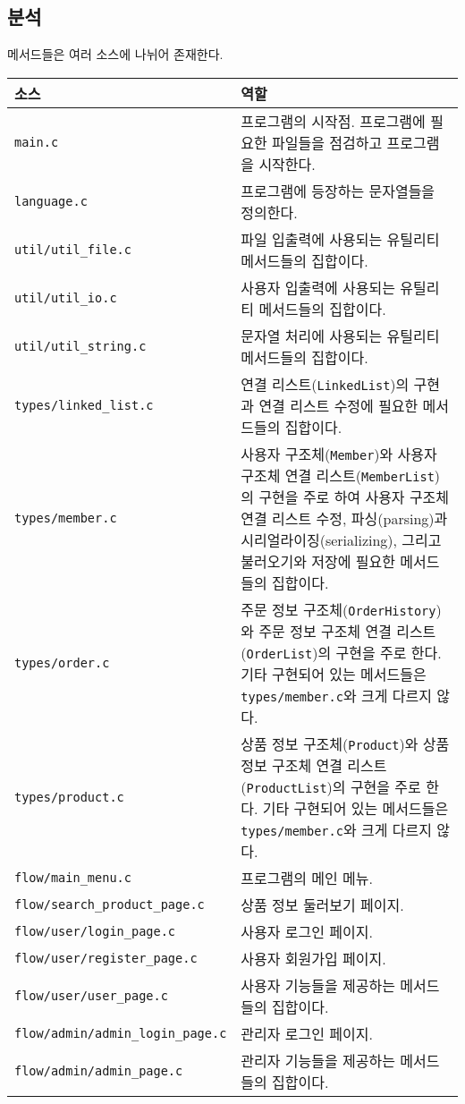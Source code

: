 \documentclass[runningheads]{llncs}
\begin{document}
\subsection{분석}
메서드들은 여러 소스에 나뉘어 존재한다.

\begin{tabularx}{\textwidth}{l|X}
	\hline
		소스	& 역할 \\
	\hline
		\texttt{main.c} & 프로그램의 시작점. 프로그램에 필요한 파일들을 점검하고 프로그램을 시작한다. \\
		\texttt{language.c} & 프로그램에 등장하는 문자열들을 정의한다. \\
	\hline
		\texttt{util/util_file.c} & 파일 입출력에 사용되는 유틸리티 메서드들의 집합이다. \\
		\texttt{util/util_io.c} & 사용자 입출력에 사용되는 유틸리티 메서드들의 집합이다. \\
		\texttt{util/util_string.c} & 문자열 처리에 사용되는 유틸리티 메서드들의 집합이다. \\
	\hline
		\texttt{types/linked_list.c} & 연결 리스트(\texttt{LinkedList})의 구현과 연결 리스트 수정에 필요한 메서드들의 집합이다. \\
		\texttt{types/member.c} & 사용자 구조체(\texttt{Member})와 사용자 구조체 연결 리스트(\texttt{MemberList})의 구현을 주로 하여 사용자 구조체 연결 리스트 수정, 파싱(parsing)과 시리얼라이징(serializing), 그리고 불러오기와 저장에 필요한 메서드들의 집합이다. \\
		\texttt{types/order.c} & 주문 정보 구조체(\texttt{OrderHistory})와 주문 정보 구조체 연결 리스트(\texttt{OrderList})의 구현을 주로 한다. 기타 구현되어 있는 메서드들은 \texttt{types/member.c}와 크게 다르지 않다. \\
		\texttt{types/product.c} & 상품 정보 구조체(\texttt{Product})와 상품 정보 구조체 연결 리스트(\texttt{ProductList})의 구현을 주로 한다. 기타 구현되어 있는 메서드들은 \texttt{types/member.c}와 크게 다르지 않다. \\
	\hline
		\texttt{flow/main_menu.c} & 프로그램의 메인 메뉴. \\
		\texttt{flow/search_product_page.c} & 상품 정보 둘러보기 페이지. \\
	\hline
		\texttt{flow/user/login_page.c} & 사용자 로그인 페이지. \\
		\texttt{flow/user/register_page.c} & 사용자 회원가입 페이지. \\
		\texttt{flow/user/user_page.c} & 사용자 기능들을 제공하는 메서드들의 집합이다. \\
	\hline
		\texttt{flow/admin/admin_login_page.c} & 관리자 로그인 페이지. \\
		\texttt{flow/admin/admin_page.c} & 관리자 기능들을 제공하는 메서드들의 집합이다. \\
	\hline
\end{tabularx}
\end{document}
